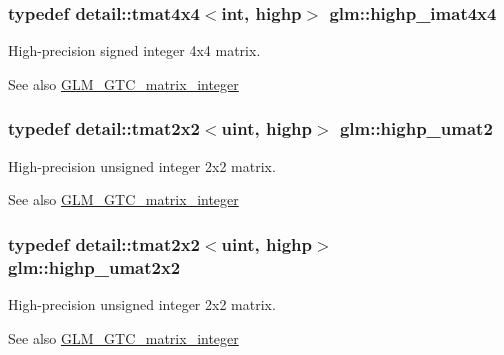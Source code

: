 \subsubsection[{\texorpdfstring{highp\+\_\+imat4x4}{highp_imat4x4}}]{\setlength{\rightskip}{0pt plus 5cm}typedef detail\+::tmat4x4$<$int, highp$>$ {\bf glm\+::highp\+\_\+imat4x4}}\hypertarget{group__gtc__matrix__integer_ga969c88d5c7530beb80768205a054ee80}{}\label{group__gtc__matrix__integer_ga969c88d5c7530beb80768205a054ee80}
High-\/precision signed integer 4x4 matrix. \begin{DoxySeeAlso}{See also}
\hyperlink{group__gtc__matrix__integer}{G\+L\+M\+\_\+\+G\+T\+C\+\_\+matrix\+\_\+integer} 
\end{DoxySeeAlso}
\subsubsection[{\texorpdfstring{highp\+\_\+umat2}{highp_umat2}}]{\setlength{\rightskip}{0pt plus 5cm}typedef detail\+::tmat2x2$<$uint, highp$>$ {\bf glm\+::highp\+\_\+umat2}}\hypertarget{group__gtc__matrix__integer_ga0c89800e3f63f82da4a4159004811cec}{}\label{group__gtc__matrix__integer_ga0c89800e3f63f82da4a4159004811cec}
High-\/precision unsigned integer 2x2 matrix. \begin{DoxySeeAlso}{See also}
\hyperlink{group__gtc__matrix__integer}{G\+L\+M\+\_\+\+G\+T\+C\+\_\+matrix\+\_\+integer} 
\end{DoxySeeAlso}
\subsubsection[{\texorpdfstring{highp\+\_\+umat2x2}{highp_umat2x2}}]{\setlength{\rightskip}{0pt plus 5cm}typedef detail\+::tmat2x2$<$uint, highp$>$ {\bf glm\+::highp\+\_\+umat2x2}}\hypertarget{group__gtc__matrix__integer_ga428410468e33d16dc8aee08b17166669}{}\label{group__gtc__matrix__integer_ga428410468e33d16dc8aee08b17166669}
High-\/precision unsigned integer 2x2 matrix. \begin{DoxySeeAlso}{See also}
\hyperlink{group__gtc__matrix__integer}{G\+L\+M\+\_\+\+G\+T\+C\+\_\+matrix\+\_\+integer} 
\end{DoxySeeAlso}
